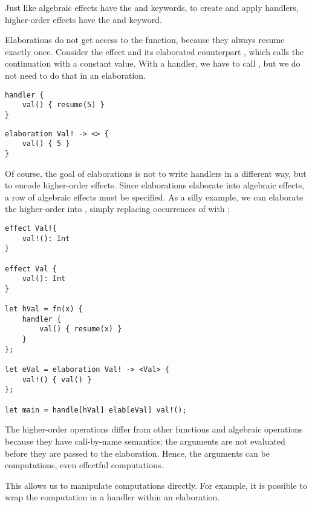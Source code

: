 Just like algebraic effects have the  and  keywords, to create and apply handlers, higher-order effects have the  and  keyword.

Elaborations do not get access to the  function, because they always resume exactly once. Consider the effect  and its elaborated counterpart , which calls the continuation with a constant value. With a handler, we have to call , but we do not need to do that in an elaboration.

\begin{minipage}[b]{0.5\textwidth}
\begin{lstlisting}[language=elaine,style=fancy]
handler {
    val() { resume(5) }
}
\end{lstlisting}
\end{minipage}
\begin{minipage}[b]{0.5\textwidth}
\begin{lstlisting}[language=elaine,style=fancy]
elaboration Val! -> <> {
    val() { 5 }
}
\end{lstlisting}
\end{minipage}

Of course, the goal of elaborations is not to write handlers in a different way, but to encode higher-order effects. Since elaborations elaborate into algebraic effects, a row of algebraic effects must be specified. As a silly example, we can elaborate the higher-order  into , simply replacing occurrences of  with ;

\begin{lstlisting}[language=elaine,style=fancy]
effect Val!{
    val!(): Int
}

effect Val {
    val(): Int
}

let hVal = fn(x) { 
    handler {
        val() { resume(x) }
    }
};

let eVal = elaboration Val! -> <Val> {
    val!() { val() }
};

let main = handle[hVal] elab[eVal] val!();
\end{lstlisting}

The higher-order operations differ from other functions and algebraic operations because they have call-by-name semantics; the arguments are not evaluated before they are passed to the elaboration. Hence, the arguments can be computations, even effectful computations.

This allows us to manipulate computations directly. For example, it is possible to wrap the computation in a handler within an elaboration.

